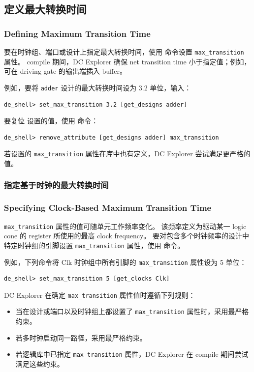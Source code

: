 \subsection{定义最大转换时间}
\subsubsection*{Defining Maximum Transition Time}

要在时钟组、端口或设计上指定最大转换时间，使用  命令设置 \texttt{max\_transition} 属性。
compile 期间，DC Explorer 确保 net transition time 小于指定值；例如，可在 driving gate 的输出端插入 buffer。

例如，要将 \texttt{adder} 设计的最大转换时间设为 3.2 单位，输入：
\begin{lstlisting}
de_shell> set_max_transition 3.2 [get_designs adder]
\end{lstlisting}

要复位  设置的值，使用  命令：
\begin{lstlisting}
de_shell> remove_attribute [get_designs adder] max_transition
\end{lstlisting}

若设置的 \texttt{max\_transition} 属性在库中也有定义，DC Explorer 尝试满足更严格的值。

\subsubsection{指定基于时钟的最大转换时间}
\subsubsection*{Specifying Clock-Based Maximum Transition Time}

\texttt{max\_transition} 属性的值可随单元工作频率变化。
该频率定义为驱动某一 logic cone 的 register 所使用的最高 clock frequency。
要对包含多个时钟频率的设计中特定时钟组的引脚设置 \texttt{max\_transition} 属性，使用  命令。

例如，下列命令将 Clk 时钟组中所有引脚的 \texttt{max\_transition} 属性设为 5 单位：
\begin{lstlisting}
de_shell> set_max_transition 5 [get_clocks Clk]
\end{lstlisting}

DC Explorer 在确定 \texttt{max\_transition} 属性值时遵循下列规则：
\begin{itemize}
  \item 当在设计或端口以及时钟组上都设置了 \texttt{max\_transition} 属性时，采用最严格约束。
  \item 若多时钟启动同一路径，采用最严格约束。
  \item 若逻辑库中已指定 \texttt{max\_transition} 属性，DC Explorer 在 compile 期间尝试满足这些约束。
\end{itemize}

